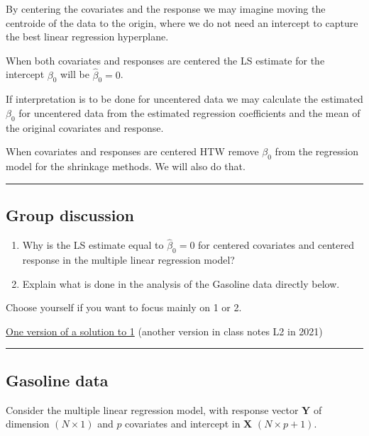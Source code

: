 \documentclass[
  letterpaper,
  DIV=11,
  numbers=noendperiod]{scrartcl}
\begin{document}
By centering the covariates and the response we may imagine moving the
centroide of the data to the origin, where we do not need an intercept
to capture the best linear regression hyperplane.

When both covariates and responses are centered the LS estimate for the
intercept \(\beta_0\) will be \(\hat{\beta}_0=0\).

If interpretation is to be done for uncentered data we may calculate the
estimated \(\beta_0\) for uncentered data from the estimated regression
coefficients and the mean of the original covariates and response.

When covariates and responses are centered HTW remove \(\beta_0\) from
the regression model for the shrinkage methods. We will also do that.

\begin{center}\rule{0.5\linewidth}{0.5pt}\end{center}

\hypertarget{group-discussion}{%
\subsection{Group discussion}\label{group-discussion}}

\begin{enumerate}
\def\labelenumi{\arabic{enumi})}
\item
  Why is the LS estimate equal to \(\hat{\beta}_0=0\) for centered
  covariates and centered response in the multiple linear regression
  model?
\item
  Explain what is done in the analysis of the Gasoline data directly
  below.
\end{enumerate}

Choose yourself if you want to focus mainly on 1 or 2.

\href{./proofbetahatv2.png}{One version of a solution to 1} (another
version in class notes L2 in 2021)

\begin{center}\rule{0.5\linewidth}{0.5pt}\end{center}

\hypertarget{gasoline-data}{%
\subsection{Gasoline data}\label{gasoline-data}}

Consider the multiple linear regression model, with response vector
\(\mathbf{Y}\) of dimension \((N \times 1)\) and \(p\) covariates and
intercept in \(\mathbf{X}\) \((N \times p+1)\).
\end{document}

